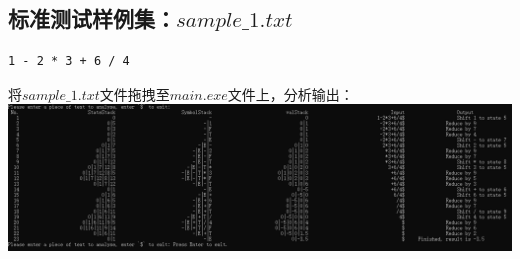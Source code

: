 \documentclass[UTF8]{ctexart}
\begin{document}
\subsection{标准测试样例集：$sample\_1.txt$}
\begin{lstlisting}
1 - 2 * 3 + 6 / 4

    \end{lstlisting}
将$sample\_1.txt$文件拖拽至$main.exe$文件上，分析输出： \\
\includegraphics[width=\textwidth]{sample_1}
\end{document}
